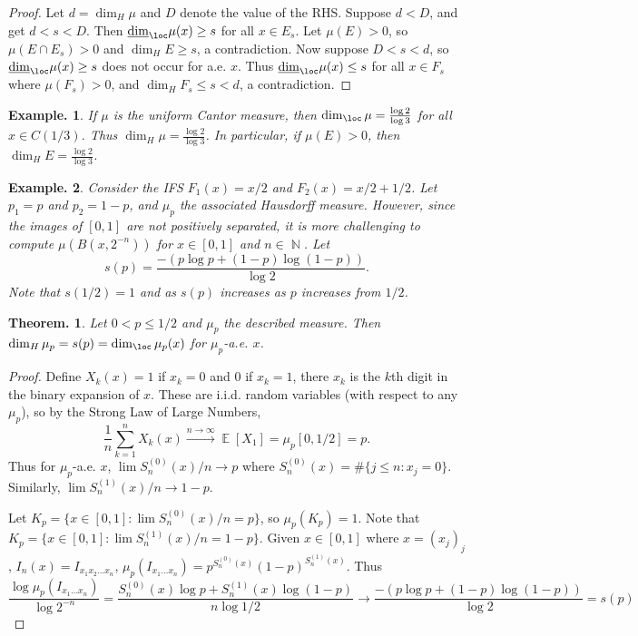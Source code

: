 \documentclass[11pt, a4paper]{memoir}
\DeclareMathOperator{\N}{{\mathbb{N}}}
\newcommand{\fto}[1]{\ensuremath{\xrightarrow{\scriptstyle{#1}}}}
\theoremstyle{change}
\newtheorem{theorem}{Theorem.}[section]
\theoremstyle{plain}
\theoremstyle{nonumberplain}
\newtheorem{example}{Example.}
\newtheorem{proof}{Proof}
\DeclareMathOperator{\E}{{\mathbb{E}}}
\numberwithin{equation}{section}
\begin{document}
\begin{proof}
    Let $d=\dim_H\mu$ and $D$ denote the value of the RHS.
    Suppose $d<D$, and get $d<s<D$.
    Then $\underline{\dim}_{\loc}\mu(x)\geq s$ for all $x\in E_s$.
    Let $\mu(E)>0$, so $\mu(E\cap E_s)>0$ and $\dim_H E\geq s$, a contradiction.
    Now suppose $D<s<d$, so $\underline{\dim}_{\loc}\mu(x)\geq s$ does not occur for a.e. $x$.
    Thus $\underline{\dim}_{\loc}\mu(x)\leq s$ for all $x\in F_s$ where $\mu(F_s)>0$, and $\dim_H F_s\leq s<d$, a contradiction.
\end{proof}
\begin{example}
    If $\mu$ is the uniform Cantor measure, then $\dim_{\loc}\mu = \frac{\log 2}{\log 3}$ for all $x\in C(1/3)$.
    Thus $\dim_H\mu=\frac{\log 2}{\log 3}$.
    In particular, if $\mu(E)>0$, then $\dim_H E=\frac{\log 2}{\log 3}$.
\end{example}
\begin{example}
    Consider the IFS $F_1(x)=x/2$ and $F_2(x)=x/2+1/2$.
    Let $p_1=p$ and $p_2=1-p$, and $\mu_p$ the associated Hausdorff measure.
    However, since the images of $[0,1]$ are not positively separated, it is more challenging to compute $\mu(B(x,2^{-n}))$ for $x\in[0,1]$ and $n\in\N$.
    Let
    \begin{equation*}
        s(p) = \frac{-(p\log p+(1-p)\log(1-p))}{\log 2}.
    \end{equation*}
    Note that $s(1/2)=1$ and as $s(p)$ increases as $p$ increases from $1/2$.
\end{example}
\begin{theorem}
    Let $0<p\leq 1/2$ and $\mu_p$ the described measure.
    Then $\dim_H\mu_p=s(p)=\dim_{\loc}\mu_p(x)$ for $\mu_p$-a.e. $x$.
\end{theorem}
\begin{proof}
    Define $X_k(x)=1$ if $x_k=0$ and $0$ if $x_k=1$, there $x_k$ is the $k$th digit in the binary expansion of $x$.
    These are i.i.d. random variables (with respect to any $\mu_p$), so by the Strong Law of Large Numbers,
    \begin{equation*}
        \frac{1}{n}\sum_{k=1}^n X_k(x)\fto{n\to\infty}\E[X_1]=\mu_p[0,1/2]=p.
    \end{equation*}
    Thus for $\mu_p$-a.e. $x$, $\lim S_n^{(0)}(x)/n\to p$ where $S_n^{(0)}(x)=\#\{j\leq n:x_j=0\}$.
    Similarly, $\lim S_n^{(1)}(x)/n\to 1-p$.

    Let $K_p=\{x\in[0,1]:\lim S_n^{(0)}(x)/n=p\}$, so $\mu_p(K_p)=1$.
    Note that $K_p=\{x\in[0,1]:\lim S_n^{(1)}(x)/n=1-p\}$.
    Given $x\in[0,1]$ where $x=(x_j)_j$, $I_n(x)=I_{x_1x_2\ldots x_n}$, $\mu_p(I_{x_1\ldots x_n})=p^{S_n^{(0)}(x)}(1-p)^{S_n^{(1)}(x)}$.
    Thus
    \begin{equation*}
        \frac{\log\mu_p(I_{x_1\ldots x_n})}{\log 2^{-n}}=\frac{S_n^{(0)}(x)\log p+S_n^{(1)}(x)\log(1-p)}{n\log 1/2}\to\frac{-(p\log p+(1-p)\log(1-p))}{\log 2}=s(p)
    \end{equation*}
\end{proof}
\end{document}
